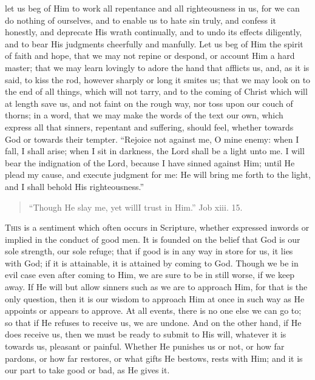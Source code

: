 let us beg of Him to work all repentance and all righteousness in us,
for we can do nothing of ourselves, and to enable us to hate sin
truly, and confess it honestly, and deprecate His wrath continually,
and to undo its effects diligently, and to bear His judgments
cheerfully and manfully. Let us beg of Him the spirit of faith and
hope, that we may not repine or despond, or account Him a hard master;
that we may learn lovingly to adore the hand that afflicts us, and, as
it is said, to kiss the rod, however sharply or long it smites us;
that we may look on to the end of all things, which will not tarry,
and to the coming of Christ which will at length save us, and not
faint on the rough way, nor toss upon our couch of thorns; in a word,
that we may make the words of the text our own, which express all that
sinners, repentant and suffering, should feel, whether towards God or
towards their tempter. ``Rejoice not against me, O mine enemy:
when I fall, I shall arise; when I sit in darkness, the Lord shall be
a light unto me. I will bear the indignation of the Lord, because I
have sinned against Him; until He plead my cause, and execute judgment
for me: He will bring me forth to the light, and I shall behold His
righteousness.''


\begin{quote}

``Though He slay me, yet will\emph{}I trust in Him.''
Job xiii. 15.

\end{quote}

T\textsc{his} is a sentiment which often occurs in Scripture, whether
expressed in\emph{}words or implied in the conduct of good men. It is
founded on the belief that God is our sole strength, our sole refuge;
that if good is in any way in store for us, it lies with God; if it is
attainable, it is attained by coming to God. Though we be in evil case
even after coming to Him, we are sure to be in still worse, if we keep
away. If He will but allow sinners such as we are to approach Him, for
that is the only question, then it is our wisdom to approach Him at
once in such way as He appoints or appears to approve. At all events,
there is no one else we can go to; so that if He refuses to receive
us, we are undone. And on the other hand, if He does receive us, then
we must be ready to submit to His will, whatever it is towards us,
pleasant or painful. Whether He punishes us or not, or how far
pardons, or how far restores, or what gifts He bestows, rests with
Him; and it is our part to take good or bad, as He gives it.

